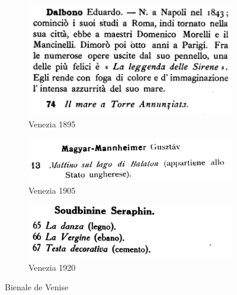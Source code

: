 \documentclass[a4paper,12pt,twoside]{book}
\begin{document}
	\begin{figure}
		\begin{subfigure}{0.5\textwidth}
		\includegraphics[scale=0.5]{venezia1895.png}
		\centering
		\caption{Venezia 1895}
	\end{subfigure}
		\begin{subfigure}{0.5\textwidth}
		\includegraphics[scale=0.5]{venezia1905.png}
		\centering
		\caption{Venezia 1905}
	\end{subfigure}
		\begin{subfigure}{0.5\textwidth}
		\includegraphics[scale=0.5]{venezia1920.png}
		\centering
		\caption{Venezia 1920}
	\end{subfigure}
	\caption{Bienale de Venise}
	\end{figure}
	
	
	
\end{document}
